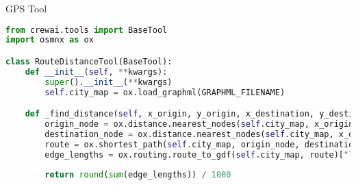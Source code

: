 \begin{frame}[fragile]{GPS Tool}
    \begin{lstlisting}[language=Python, breaklines=true]
from crewai.tools import BaseTool
import osmnx as ox

class RouteDistanceTool(BaseTool):
    def __init__(self, **kwargs):
        super().__init__(**kwargs)
        self.city_map = ox.load_graphml(GRAPHML_FILENAME)

    def _find_distance(self, x_origin, y_origin, x_destination, y_destination):
        origin_node = ox.distance.nearest_nodes(self.city_map, x_origin, y_origin)
        destination_node = ox.distance.nearest_nodes(self.city_map, x_destination, y_destination)
        route = ox.shortest_path(self.city_map, origin_node, destination_node, weight="travel_time")
        edge_lengths = ox.routing.route_to_gdf(self.city_map, route)["length"]
        
        return round(sum(edge_lengths)) / 1000
    \end{lstlisting}
\end{frame}